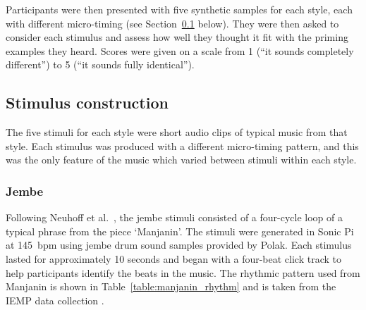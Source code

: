 \documentclass[12pt,twoside,openright]{report}
\begin{document}
Participants were then presented with five synthetic samples for each style,
each with different micro-timing (see Section~\ref{stimulus_construction} below). They were then asked to consider each stimulus and assess how
well they thought it fit with the priming examples they heard. Scores were given
on a scale from 1 (``it sounds completely different'') to 5 (``it sounds fully
identical'').


\subsection{Stimulus construction} \label{stimulus_construction}

The five stimuli for each style were short audio clips of typical music from that style. Each stimulus was produced with a different micro-timing pattern, and this was the only feature of the music which varied between stimuli within each style.

\subsubsection{Jembe} \label{jembe_stimuli}

Following Neuhoff et al.\ \cite{neuhoff2017}, the jembe stimuli consisted of a
four-cycle loop of a typical phrase from the piece `Manjanin'. The stimuli were
generated in Sonic Pi at 145~bpm using jembe drum sound samples provided by
Polak. Each stimulus lasted for approximately 10 seconds and began with a
four-beat click track to help participants identify the beats in the music. The
rhythmic pattern used from Manjanin is shown in Table~\ref{table:manjanin_rhythm} and is taken from the IEMP
data collection \cite{polak2020}.
\end{document}
